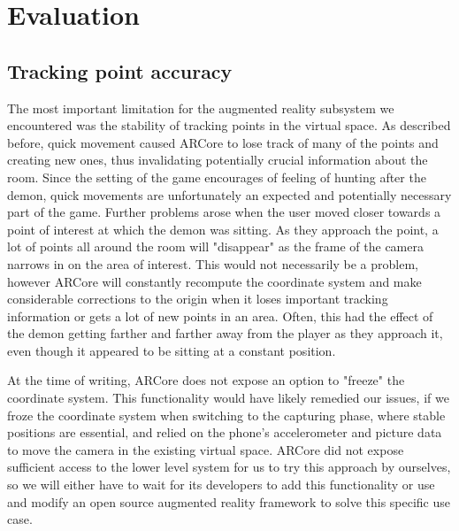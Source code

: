 \section{Evaluation}
\label{sec:evaluation}

\subsection{Tracking point accuracy}
The most important limitation for the augmented reality subsystem we encountered was the stability of tracking points in the virtual space. As described before, quick movement caused ARCore to lose track of many of the points and creating new ones, thus invalidating potentially crucial information about the room. Since the setting of the game encourages of feeling of hunting after the demon, quick movements are unfortunately an expected and potentially necessary part of the game. Further problems arose when the user moved closer towards a point of interest at which the demon was sitting. As they approach the point, a lot of points all around the room will "disappear" as the frame of the camera narrows in on the area of interest. This would not necessarily be a problem, however ARCore will constantly recompute the coordinate system and make considerable corrections to the origin when it loses important tracking information or gets a lot of new points in an area. Often, this had the effect of the demon getting farther and farther away from the player as they approach it, even though it appeared to be sitting at a constant position.

At the time of writing, ARCore does not expose an option to "freeze" the coordinate system. This functionality would have likely remedied our issues, if we froze the coordinate system when switching to the capturing phase, where stable positions are essential, and relied on the phone's accelerometer and picture data to move the camera in the existing virtual space. ARCore did not expose sufficient access to the lower level system for us to try this approach by ourselves, so we will either have to wait for its developers to add this functionality or use and modify an open source augmented reality framework to solve this specific use case.

